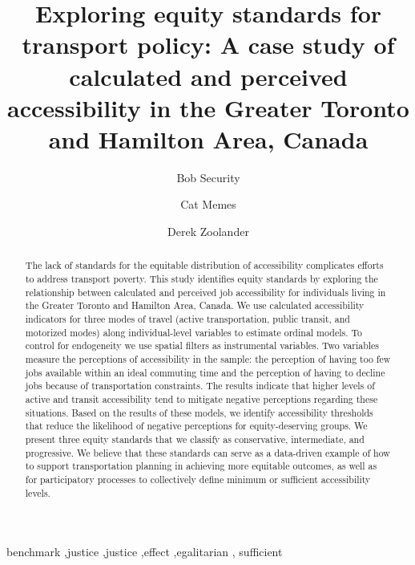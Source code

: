 \documentclass[preprint, 3p,
authoryear]{elsarticle} %
\begin{document}
\begin{frontmatter}

  \title{Exploring equity standards for transport policy: A case study
of calculated and perceived accessibility in the Greater Toronto and
Hamilton Area, Canada}
    \author[Some Institute of Technology]{Bob Security%
  }
    \author[Another University]{Cat Memes%
  }
    \author[Some Institute of Technology]{Derek Zoolander%
  }
  
  \begin{abstract}
  The lack of standards for the equitable distribution of accessibility
  complicates efforts to address transport poverty. This study
  identifies equity standards by exploring the relationship between
  calculated and perceived job accessibility for individuals living in
  the Greater Toronto and Hamilton Area, Canada. We use calculated
  accessibility indicators for three modes of travel (active
  transportation, public transit, and motorized modes) along
  individual-level variables to estimate ordinal models. To control for
  endogeneity we use spatial filters as instrumental variables. Two
  variables measure the perceptions of accessibility in the sample: the
  perception of having too few jobs available within an ideal commuting
  time and the perception of having to decline jobs because of
  transportation constraints. The results indicate that higher levels of
  active and transit accessibility tend to mitigate negative perceptions
  regarding these situations. Based on the results of these models, we
  identify accessibility thresholds that reduce the likelihood of
  negative perceptions for equity-deserving groups. We present three
  equity standards that we classify as conservative, intermediate, and
  progressive. We believe that these standards can serve as a
  data-driven example of how to support transportation planning in
  achieving more equitable outcomes, as well as for participatory
  processes to collectively define minimum or sufficient accessibility
  levels.
  \end{abstract}
    \begin{keyword}
    benchmark \sep justice \sep justice \sep effect \sep egalitarian \sep 
    sufficient
  \end{keyword}
  
 \end{frontmatter}
\end{document}
